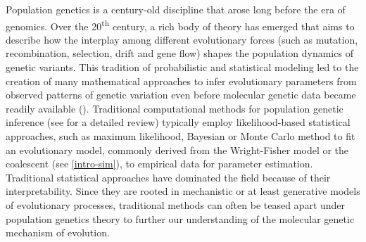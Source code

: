 Population genetics is a century-old discipline that arose long before the era of genomics. Over the 20\textsuperscript{th} century, a rich body of theory has emerged that aims to describe how the interplay among different evolutionary forces (such as mutation, recombination, selection, drift and gene flow) shapes the population dynamics of genetic variants. This tradition of probabilistic and statistical modeling led to the creation of many mathematical approaches to infer evolutionary parameters from observed patterns of genetic variation even before molecular genetic data became readily available (\cite{korfmann_deep_2023}). Traditional computational methods for population genetic inference (see \cite{marjoram2006modern} for a detailed review) typically employ likelihood-based statistical approaches, such as maximum likelihood, Bayesian or Monte Carlo method to fit an evolutionary model, commonly derived from the Wright-Fisher model or the coalescent (see \ref{intro-sim}), to empirical data for parameter estimation. Traditional statistical approaches have dominated the field because of their interpretability. Since they are rooted in mechanistic or at least generative models of evolutionary processes, traditional methods can often be teased apart under population genetics theory to further our understanding of the molecular genetic mechanism of evolution.

